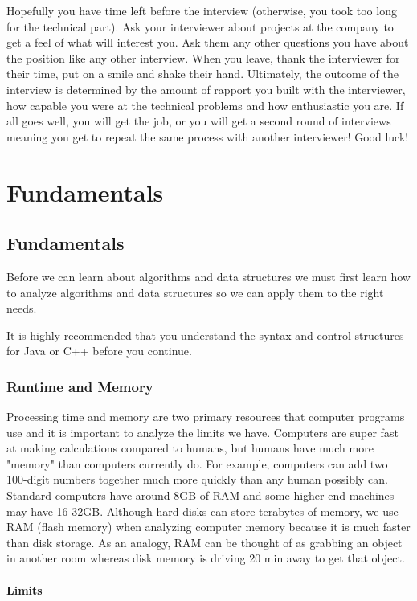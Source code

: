 \documentclass[11pt,oneside]{book}
\begin{document}
Hopefully you have time left before the interview (otherwise, you took too long for the technical part). Ask your interviewer about projects at the company to get a feel of what will interest you. Ask them any other questions you have about the position like any other interview. When you leave, thank the interviewer for their time, put on a smile and shake their hand. Ultimately, the outcome of the interview is determined by the amount of rapport you built with the interviewer, how capable you were at the technical problems and how enthusiastic you are. If all goes well, you will get the job, or you will get a second round of interviews meaning you get to repeat the same process with another interviewer! Good luck!

\part{ Fundamentals }
    \chapter{ Fundamentals }
        

Before we can learn about algorithms and data structures we must first learn how to analyze algorithms and data structures so we can apply them to the right needs.

It is highly recommended that you understand the syntax and control structures for Java or C++ before you continue.


        \section{ Runtime and Memory }
        

Processing time and memory are two primary resources that computer programs use and it is important to analyze the limits we have. Computers are super fast at making calculations compared to humans, but humans have much more "memory" than computers currently do. For example, computers can add two 100-digit numbers together much more quickly than any human possibly can. Standard computers have around 8GB of RAM and some higher end machines may have 16-32GB. Although hard-disks can store terabytes of memory, we use RAM (flash memory) when analyzing computer memory because it is much faster than disk storage. As an analogy, RAM can be thought of as grabbing an object in another room whereas disk memory is driving 20 min away to get that object.

\subsection{Limits}
\end{document}
